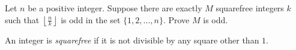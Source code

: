 Let $n$ be a positive integer. Suppose there are exactly $M$ squarefree integers $k$ such that $\left\lfloor\frac nk\right\rfloor$ is odd in the set $\{ 1, 2,\ldots, n\}$. Prove $M$ is odd.

An integer is \textit{squarefree} if it is not divisible by any square other than $1$.